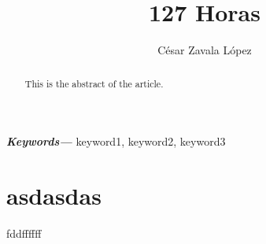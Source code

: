 \documentclass{article}
\date{}
\title{127 Horas}
\author[1,*]{César Zavala López \orcidlink{0000-1111-1111-2222}}
\affil[1]{Universidad Politécnica de victoria}
\providecommand{\keywords}[1]
{
  \small  
  \textbf{\textit{Keywords---}} #1
}
\begin{document}
\maketitle
\begin{abstract}
This is the abstract of the article.
\end{abstract}
\keywords{keyword1, keyword2, keyword3}
\section{asdasdas}
fddffffff
\end{document}
